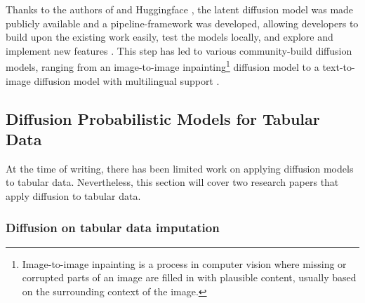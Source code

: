 Thanks to the authors of \cite{rombach2022HighResolutionImageSynthesis} and Huggingface \cite{huggingface2023HuggingFaceAI}, the latent diffusion \gls{model} was made publicly available and a
pipeline-framework was developed, allowing developers to build upon the existing work easily, test the models locally, and explore and implement new features \cite{huggingface2023DiffusersPipelines}.
This step has led to various community-build diffusion models, ranging from an image-to-image inpainting\footnote{Image-to-image inpainting is a process in computer vision where missing or corrupted parts of an image are filled in with plausible content, usually based on the surrounding context of the image.} diffusion \gls{model} to a text-to-image diffusion \gls{model} with multilingual support \cite{huggingface2023CommunityExamples}.

\subsection{Diffusion Probabilistic Models for Tabular Data}
\label{ch:preliminaries-generativeAlgorithms-diffusionProbabilisticModelsTabularData}
At the time of writing, there has been limited work on applying diffusion models to tabular data.
Nevertheless, this section will cover two research papers that apply diffusion to tabular data.

\subsubsection{Diffusion on tabular data imputation}

